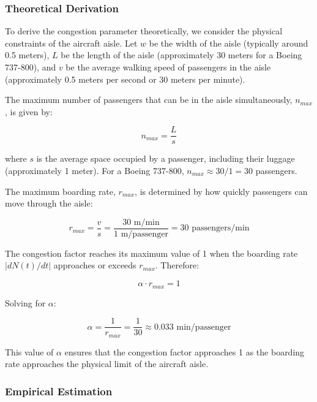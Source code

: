\documentclass[12pt,a4paper]{article}
\begin{document}
\subsubsection{Theoretical Derivation}

To derive the congestion parameter theoretically, we consider the physical constraints of the aircraft aisle. Let $w$ be the width of the aisle (typically around 0.5 meters), $L$ be the length of the aisle (approximately 30 meters for a Boeing 737-800), and $v$ be the average walking speed of passengers in the aisle (approximately 0.5 meters per second or 30 meters per minute).

The maximum number of passengers that can be in the aisle simultaneously, $n_{max}$, is given by:

\begin{equation}
n_{max} = \frac{L}{s}
\end{equation}

where $s$ is the average space occupied by a passenger, including their luggage (approximately 1 meter). For a Boeing 737-800, $n_{max} \approx 30 / 1 = 30$ passengers.

The maximum boarding rate, $r_{max}$, is determined by how quickly passengers can move through the aisle:

\begin{equation}
r_{max} = \frac{v}{s} = \frac{30 \text{ m/min}}{1 \text{ m/passenger}} = 30 \text{ passengers/min}
\end{equation}

The congestion factor reaches its maximum value of 1 when the boarding rate $|dN(t)/dt|$ approaches or exceeds $r_{max}$. Therefore:

\begin{equation}
\alpha \cdot r_{max} = 1
\end{equation}

Solving for $\alpha$:

\begin{equation}
\alpha = \frac{1}{r_{max}} = \frac{1}{30} \approx 0.033 \text{ min/passenger}
\end{equation}

This value of $\alpha$ ensures that the congestion factor approaches 1 as the boarding rate approaches the physical limit of the aircraft aisle.

\subsubsection{Empirical Estimation}
\end{document}
